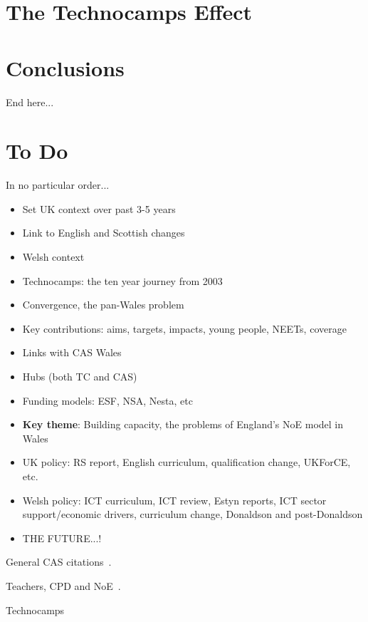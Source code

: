 \documentclass{sig-alternate}
\begin{document}
\section{The Technocamps Effect}

\section{Conclusions}
End here...






\section*{To Do}

In no particular order...

\begin{itemize}
\item Set UK context over past 3-5 years
\item Link to English and Scottish changes
\item Welsh context
\item Technocamps: the ten year journey from 2003
\item Convergence, the pan-Wales problem
\item Key contributions: aims, targets, impacts, young people, NEETs, coverage
\item Links with CAS Wales
\item Hubs (both TC and CAS)
\item Funding models: ESF, NSA, Nesta, etc
\item {\textbf{Key theme}}: Building capacity, the problems of
  England's NoE model in Wales
\item UK policy: RS report, English curriculum, qualification change,
  UKForCE, etc.
\item Welsh policy: ICT curriculum, ICT review, Estyn reports, ICT
  sector support/economic drivers, curriculum change,
  Donaldson and post-Donaldson
\item THE FUTURE...!
\end{itemize}

General CAS
citations~\cite{crick+sentance:2011,brown-et-al-sigcse2012,brown-et-al-toce2014}.

Teachers, CPD and
NoE~\cite{sentance-et-al-wipsce2012,sentance-et-al:2013,sentance-et-al:2014}.

Technocamps~\cite{ball-et-al:2012,boyle-et-al:2012}
\end{document}
